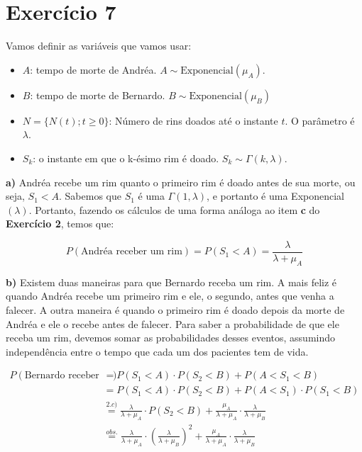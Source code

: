 \documentclass[12pt]{article}
\begin{document}
	 \section*{Exercício 7}
	 
	 Vamos definir as variáveis que vamos usar:
	 
	 \begin{itemize}
	 	\item $ A $: tempo de morte de Andréa. $A \sim \text{Exponencial}(\mu_A)$.
	 	\item $ B $: tempo de morte de Bernardo. $B \sim \text{Exponencial}(\mu_B)$
	 	\item $ N = \{N(t); t\geq0\}$: Número de rins doados até o instante $ t $. O parâmetro é $ \lambda $.
	 	\item $ S_k $: o instante em que o k-ésimo rim é doado. $S_k \sim \Gamma(k, \lambda)$.
	 \end{itemize}
	 
	 \textbf{a)} Andréa recebe um rim quanto o primeiro rim é doado antes de sua morte, ou seja, $ S_1 < A $. Sabemos que $ S_1 $ é uma $ \Gamma(1, \lambda) $, e portanto é uma Exponencial$ (\lambda) $. Portanto, fazendo os cálculos de uma forma análoga ao item \textbf{c} do \textbf{Exercício 2}, temos que:
	 
	 \begin{equation*}
	 	P(\text{Andréa receber um rim}) = P(S_1 < A) = \frac{\lambda}{\lambda + \mu_A}
	 \end{equation*}
	 
	 \textbf{b)} Existem duas maneiras para que Bernardo receba um rim. A mais feliz é quando Andréa recebe um primeiro rim e ele, o segundo, antes que venha a falecer. A outra maneira é quando o primeiro rim é doado depois da morte de Andréa e ele o recebe antes de falecer. Para saber a probabilidade de que ele receba um rim, devemos somar as probabilidades desses eventos, assumindo independência entre o tempo que cada um dos pacientes tem de vida.
	 
	 \begin{equation*}
		 \begin{split}
			 P(\text{Bernardo receber um rim}) & = P(S_1 < A) \cdot P(S_2 < B) + P(A < S_1 < B) \\
			 & = P(S_1 < A) \cdot P(S_2 < B) + P(A < S_1) \cdot P(S_1 < B) \\
			 & \stackrel{2.c)}{=} \frac{\lambda}{\lambda + \mu_A} \cdot P(S_2 < B) + \frac{\mu_A}{\lambda + \mu_A} \cdot \frac{\lambda}{\lambda + \mu_B} \\
			 & \stackrel{obs.}{=} \frac{\lambda}{\lambda + \mu_A} \cdot \left(\frac{\lambda}{\lambda + \mu_B} \right)^2 + \frac{\mu_A}{\lambda + \mu_A} \cdot \frac{\lambda}{\lambda + \mu_B}
		 \end{split}
	 \end{equation*}
	 
\end{document}
